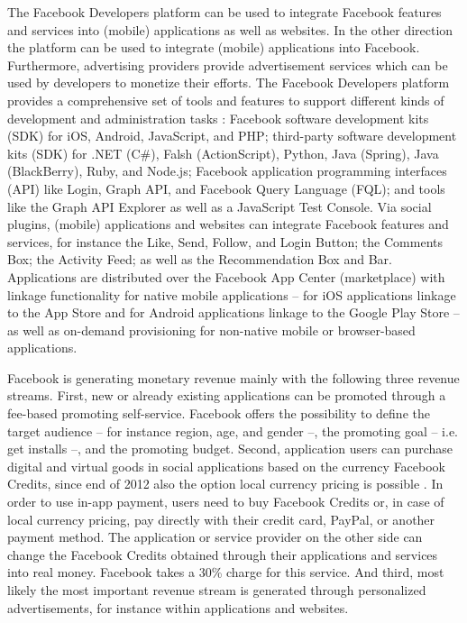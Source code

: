 The Facebook Developers platform can be used to integrate Facebook features and services into (mobile) applications as well as websites. In the other direction the platform can be used to integrate (mobile) applications into Facebook. Furthermore, advertising providers provide advertisement services which can be used by developers to monetize their efforts. The Facebook Developers platform provides a comprehensive set of tools and features to support different kinds of development and administration tasks \citep{Facebook2013a}: Facebook software development kits (SDK) for iOS, Android, JavaScript, and PHP; third-party software development kits (SDK) for .NET (C\#), Falsh (ActionScript), Python, Java (Spring), Java (BlackBerry), Ruby, and Node.js; Facebook application programming interfaces (API) like Login, Graph API, and Facebook Query Language (FQL); and tools like the Graph API Explorer as well as a JavaScript Test Console. Via social plugins, (mobile) applications and websites can integrate Facebook features and services, for instance the Like, Send, Follow, and Login Button; the Comments Box; the Activity Feed; as well as the Recommendation Box and Bar. Applications are distributed over the Facebook App Center (marketplace) with linkage functionality for native mobile applications -- for iOS applications linkage to the App Store and for Android applications linkage to the Google Play Store -- as well as on-demand provisioning for non-native mobile or browser-based applications.

Facebook is generating monetary revenue mainly with the following three revenue streams. First, new or already existing applications can be promoted through a fee-based promoting self-service. Facebook offers the possibility to define the target audience -- for instance region, age, and gender --, the promoting goal -- i.e. get installs --, and the promoting budget. Second, application users can purchase digital and virtual goods in social applications based on the currency Facebook Credits, since end of 2012 also the option local currency pricing is possible \citep{Facebook2013a}. In order to use in-app payment, users need to buy Facebook Credits or, in case of local currency pricing, pay directly with their credit card, PayPal, or another payment method. The application or service provider on the other side can change the Facebook Credits obtained through their applications and services into real money. Facebook takes a 30\% charge for this service. And third, most likely the most important revenue stream is generated through personalized advertisements, for instance within applications and websites.

